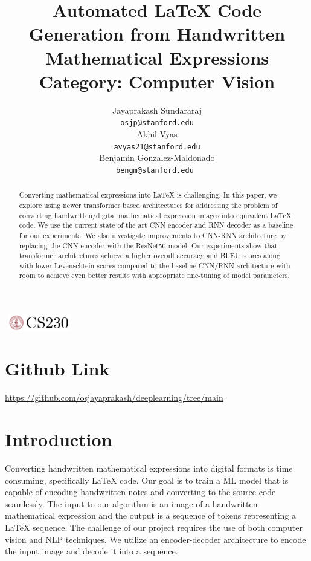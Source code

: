 \documentclass{article}
\title{Automated LaTeX Code Generation from Handwritten Mathematical Expressions \\
Category: Computer Vision}
\author{
  Jayaprakash Sundararaj \\
  \texttt{osjp@stanford.edu}  \\
  \AND
  Akhil Vyas \\
  \texttt{avyas21@stanford.edu}  \\
  \AND
  Benjamin Gonzalez-Maldonado \\
  \texttt{bengm@stanford.edu } \\
}
\begin{document}

\begin{center}
\includegraphics[width=3cm, height=0.7cm]{CS230}
\end{center}

\maketitle

\begin{abstract}
Converting mathematical expressions into LaTeX is challenging. In this paper, we explore using newer transformer based architectures for addressing the problem of converting handwritten/digital mathematical expression images into equivalent LaTeX code. We use the current state of the art CNN encoder and RNN decoder as a baseline for our experiments. We also investigate improvements to CNN-RNN architecture by replacing the CNN encoder with the ResNet50 model. Our experiments show that transformer architectures achieve a higher overall accuracy and BLEU scores along with lower Levenschtein scores compared to the baseline CNN/RNN architecture with room to achieve even better results with appropriate fine-tuning of model parameters.
\end{abstract}

\section{Github Link}

\url{https://github.com/osjayaprakash/deeplearning/tree/main}

\section{Introduction}	

Converting handwritten mathematical expressions into digital formats is time consuming, specifically LaTeX code. Our goal is to train a ML model that is capable of encoding handwritten notes and converting to the source code seamlessly. The input to our algorithm is an image of a handwritten mathematical expression and the output is a sequence of tokens representing a LaTeX sequence. The challenge of our project requires the use of both computer vision and NLP techniques. We utilize an encoder-decoder architecture to encode the input image and decode it into a sequence.
\end{document}

